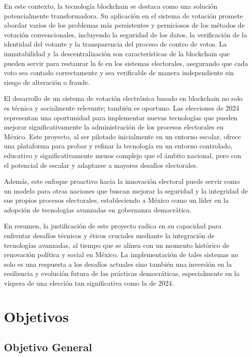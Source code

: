 \documentclass{report}
\begin{document}
	En este contexto, la tecnología blockchain se destaca como una solución potencialmente transformadora. Su aplicación en el sistema de votación promete abordar varios de los problemas más persistentes y perniciosos de los métodos de votación convencionales, incluyendo la seguridad de los datos, la verificación de la identidad del votante y la transparencia del proceso de conteo de votos. La inmutabilidad y la descentralización son características de la blockchain que pueden servir para restaurar la fe en los sistemas electorales, asegurando que cada voto sea contado correctamente y sea verificable de manera independiente sin riesgo de alteración o fraude.
	
	El desarrollo de un sistema de votación electrónica basado en blockchain no solo es técnica y socialmente relevante; también es oportuno. Las elecciones de 2024 representan una oportunidad para implementar nuevas tecnologías que pueden mejorar significativamente la administración de los procesos electorales en México. Este proyecto, al ser pilotado inicialmente en un entorno escolar, ofrece una plataforma para probar y refinar la tecnología en un entorno controlado, educativo y significativamente menos complejo que el ámbito nacional, pero con el potencial de escalar y adaptarse a mayores desafíos electorales.
	
	Además, este enfoque proactivo hacia la innovación electoral puede servir como un modelo para otras naciones que buscan mejorar la seguridad y la integridad de sus propios procesos electorales, estableciendo a México como un líder en la adopción de tecnologías avanzadas en gobernanza democrática.
	
	En resumen, la justificación de este proyecto radica en su capacidad para enfrentar desafíos técnicos y éticos cruciales mediante la integración de tecnologías avanzadas, al tiempo que se alinea con un momento histórico de renovación política y social en México. La implementación de tales sistemas no solo es una respuesta a los desafíos actuales sino también una inversión en la resiliencia y evolución futura de las prácticas democráticas, especialmente en la víspera de una elección tan significativa como la de 2024.
	
	\section{Objetivos}
	
	\subsection{Objetivo General}
	
\end{document}
